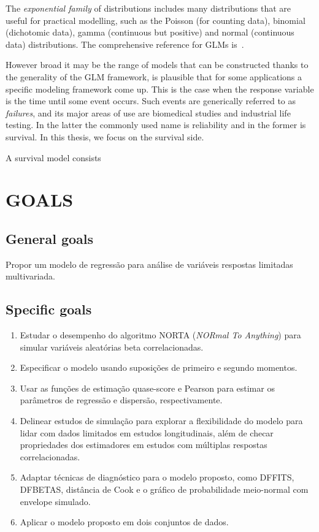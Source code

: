 The \textit{exponential family} of distributions includes many
distributions that are useful for practical modelling, such as the
Poisson (for counting data), binomial (dichotomic data), gamma
(continuous but positive) and normal (continuous data) distributions.
The comprehensive reference for GLMs is~.

However broad it may be the range of models that can be constructed
thanks to the generality of the GLM framework, is plausible that for
some applications a specific modeling framework come up. This is the
case when the response variable is the time until some event occurs.
Such events are generically referred to as \textit{failures}, and its
major areas of use are biomedical studies and industrial life testing.
In the latter the commonly used name is reliability and in the former is
survival. In this thesis, we focus on the survival side.

A survival model consists

\section{GOALS}

\subsection{General goals}

Propor um modelo de regressão para análise de variáveis respostas
limitadas multivariada.

\subsection{Specific goals}

\begin{enumerate}
\item Estudar o desempenho do algoritmo NORTA (\emph{NORmal To
    Anything}) para simular variáveis aleatórias beta correlacionadas.

\item Especificar o modelo usando suposições de primeiro e segundo
  momentos.

\item Usar as funções de estimação quase-score e Pearson para estimar os
  parâmetros de regressão e dispersão, respectivamente.

\item Delinear estudos de simulação para explorar a flexibilidade do
  modelo para lidar com dados limitados em estudos longitudinais, além
  de checar propriedades dos estimadores em estudos com múltiplas
  respostas correlacionadas.

\item Adaptar técnicas de diagnóstico para o modelo proposto, como
  DFFITS, DFBETAS, distância de Cook e o gráfico de probabilidade
  meio-normal com envelope simulado.

\item Aplicar o modelo proposto em dois conjuntos de dados.
\end{enumerate}

